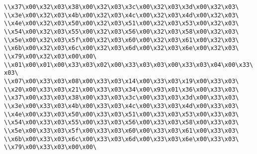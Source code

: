 \verb|\\x37\x00\x32\x03\x38\x00\x32\x03\x3c\x00\x32\x03\x3d\x00\x32\x03\|\newline
\verb|\\x3e\x00\x32\x03\x4b\x00\x32\x03\x4c\x00\x32\x03\x4d\x00\x32\x03\|\newline
\verb|\\x4e\x00\x32\x03\x50\x00\x32\x03\x51\x00\x32\x03\x53\x00\x32\x03\|\newline
\verb|\\x54\x00\x32\x03\x55\x00\x32\x03\x56\x00\x32\x03\x58\x00\x32\x03\|\newline
\verb|\\x5e\x00\x32\x03\x5f\x00\x32\x03\x60\x00\x32\x03\x61\x00\x32\x03\|\newline
\verb|\\x6b\x00\x32\x03\x6c\x00\x32\x03\x6d\x00\x32\x03\x6e\x00\x32\x03\|\newline
\verb|\\x79\x00\x32\x03\x00\x00\|\newline
\verb|\\x01\x00\x01\x00\x33\x03\x02\x00\x33\x03\x03\x00\x33\x03\x04\x00\x33\x03\|\newline
\verb|\\x07\x00\x33\x03\x08\x00\x33\x03\x14\x00\x33\x03\x19\x00\x33\x03\|\newline
\verb|\\x20\x00\x33\x03\x21\x00\x33\x03\x34\x00\x93\x01\x36\x00\x33\x03\|\newline
\verb|\\x37\x00\x33\x03\x38\x00\x33\x03\x3c\x00\x33\x03\x3d\x00\x33\x03\|\newline
\verb|\\x3e\x00\x33\x03\x4b\x00\x33\x03\x4c\x00\x33\x03\x4d\x00\x33\x03\|\newline
\verb|\\x4e\x00\x33\x03\x50\x00\x33\x03\x51\x00\x33\x03\x53\x00\x33\x03\|\newline
\verb|\\x54\x00\x33\x03\x55\x00\x33\x03\x56\x00\x33\x03\x58\x00\x33\x03\|\newline
\verb|\\x5e\x00\x33\x03\x5f\x00\x33\x03\x60\x00\x33\x03\x61\x00\x33\x03\|\newline
\verb|\\x6b\x00\x33\x03\x6c\x00\x33\x03\x6d\x00\x33\x03\x6e\x00\x33\x03\|\newline
\verb|\\x79\x00\x33\x03\x00\x00\|\newline
